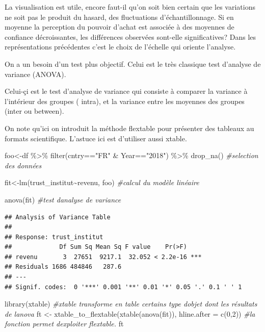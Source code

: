 \documentclass[
]{book}
\newenvironment{Shaded}{\begin{snugshade}}{\end{snugshade}}
\newcommand{\AttributeTok}[1]{\textcolor[rgb]{0.77,0.63,0.00}{#1}}
\newcommand{\CommentTok}[1]{\textcolor[rgb]{0.56,0.35,0.01}{\textit{#1}}}
\newcommand{\DecValTok}[1]{\textcolor[rgb]{0.00,0.00,0.81}{#1}}
\newcommand{\FunctionTok}[1]{\textcolor[rgb]{0.00,0.00,0.00}{#1}}
\newcommand{\NormalTok}[1]{#1}
\newcommand{\OtherTok}[1]{\textcolor[rgb]{0.56,0.35,0.01}{#1}}
\newcommand{\SpecialCharTok}[1]{\textcolor[rgb]{0.00,0.00,0.00}{#1}}
\newcommand{\StringTok}[1]{\textcolor[rgb]{0.31,0.60,0.02}{#1}}
\begin{document}
La visualisation est utile, encore faut-il qu'on soit bien certain que les variations ne soit pas le produit du hasard, des fluctuations d'échantillonnage. Si en moyenne la perception du pouvoir d'achat est associée à des moyennes de confiance décroissantes, les différences observées sont-elle significatives? Dans les représentations précédentes c'est le choix de l'échelle qui oriente l'analyse.

On a un besoin d'un test plus objectif. Celui est le très classique test d'analyse de variance (ANOVA).

Celui-çi est le test d'analyse de variance qui consiste à comparer la variance à l'intérieur des groupes ( intra), et la variance entre les moyennes des groupes (inter ou between).

On note qu'ici on introduit la méthode flextable pour présenter des tableaux au formats scientifique. L'astuce ici est d'utiliser aussi xtable.

\begin{Shaded}
\begin{Highlighting}[]
\NormalTok{foo}\OtherTok{\textless{}{-}}\NormalTok{df }\SpecialCharTok{\%\textgreater{}\%} 
  \FunctionTok{filter}\NormalTok{(cntry}\SpecialCharTok{==}\StringTok{"FR"} \SpecialCharTok{\&}\NormalTok{ Year}\SpecialCharTok{==}\StringTok{"2018"}\NormalTok{) }\SpecialCharTok{\%\textgreater{}\%} \FunctionTok{drop\_na}\NormalTok{() }\CommentTok{\#selection des données}

\NormalTok{fit}\OtherTok{\textless{}{-}}\FunctionTok{lm}\NormalTok{(trust\_institut}\SpecialCharTok{\textasciitilde{}}\NormalTok{revenu, foo) }\CommentTok{\#calcul du modèle linéaire}

\FunctionTok{anova}\NormalTok{(fit) }\CommentTok{\#test d\textquotesingle{}analyse de variance}
\end{Highlighting}
\end{Shaded}

\begin{verbatim}
## Analysis of Variance Table
## 
## Response: trust_institut
##             Df Sum Sq Mean Sq F value    Pr(>F)    
## revenu       3  27651  9217.1  32.052 < 2.2e-16 ***
## Residuals 1686 484846   287.6                      
## ---
## Signif. codes:  0 '***' 0.001 '**' 0.01 '*' 0.05 '.' 0.1 ' ' 1
\end{verbatim}

\begin{Shaded}
\begin{Highlighting}[]
\FunctionTok{library}\NormalTok{(xtable) }\CommentTok{\#xtable transforme en table certains type d\textquotesingle{}objet dont les résultats de l\textquotesingle{}anova}
\NormalTok{ft }\OtherTok{\textless{}{-}} \FunctionTok{xtable\_to\_flextable}\NormalTok{(}\FunctionTok{xtable}\NormalTok{(}\FunctionTok{anova}\NormalTok{(fit)), }\AttributeTok{hline.after =} \FunctionTok{c}\NormalTok{(}\DecValTok{0}\NormalTok{,}\DecValTok{2}\NormalTok{)) }\CommentTok{\#la fonction permet d\textquotesingle{}exploiter flextable.}
\NormalTok{ft}
\end{Highlighting}
\end{Shaded}
\end{document}
